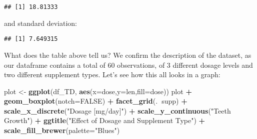 \documentclass[]{article}
\newenvironment{Shaded}{\begin{snugshade}}{\end{snugshade}}
\newcommand{\DataTypeTok}[1]{\textcolor[rgb]{0.13,0.29,0.53}{#1}}
\newcommand{\KeywordTok}[1]{\textcolor[rgb]{0.13,0.29,0.53}{\textbf{#1}}}
\newcommand{\NormalTok}[1]{#1}
\newcommand{\OperatorTok}[1]{\textcolor[rgb]{0.81,0.36,0.00}{\textbf{#1}}}
\newcommand{\OtherTok}[1]{\textcolor[rgb]{0.56,0.35,0.01}{#1}}
\newcommand{\StringTok}[1]{\textcolor[rgb]{0.31,0.60,0.02}{#1}}
\begin{document}
\begin{Shaded}
\end{Shaded}

\begin{verbatim}
## [1] 18.81333
\end{verbatim}

and standard deviation:

\begin{Shaded}
\end{Shaded}

\begin{verbatim}
## [1] 7.649315
\end{verbatim}

What does the table above tell us? We confirm the description of the
dataset, as our dataframe contains a total of 60 observations, of 3
different dosage levels and two different supplement types. Let's see
how this all looks in a graph:

\begin{Shaded}
\begin{Highlighting}[]
\NormalTok{plot <-}\StringTok{ }\KeywordTok{ggplot}\NormalTok{(df_TD, }
               \KeywordTok{aes}\NormalTok{(}\DataTypeTok{x=}\NormalTok{dose,}\DataTypeTok{y=}\NormalTok{len,}\DataTypeTok{fill=}\NormalTok{dose))}
\NormalTok{plot }\OperatorTok{+}\StringTok{ }\KeywordTok{geom_boxplot}\NormalTok{(}\DataTypeTok{notch=}\OtherTok{FALSE}\NormalTok{) }\OperatorTok{+}\StringTok{ }\KeywordTok{facet_grid}\NormalTok{(.}\OperatorTok{~}\NormalTok{supp) }\OperatorTok{+}
\StringTok{     }\KeywordTok{scale_x_discrete}\NormalTok{(}\StringTok{"Dosage [mg/day]"}\NormalTok{) }\OperatorTok{+}\StringTok{   }
\StringTok{     }\KeywordTok{scale_y_continuous}\NormalTok{(}\StringTok{"Teeth Growth"}\NormalTok{) }\OperatorTok{+}\StringTok{  }
\StringTok{     }\KeywordTok{ggtitle}\NormalTok{(}\StringTok{"Effect of Dosage and Supplement Type"}\NormalTok{) }\OperatorTok{+}
\StringTok{     }\KeywordTok{scale_fill_brewer}\NormalTok{(}\DataTypeTok{palette=}\StringTok{"Blues"}\NormalTok{)}
\end{Highlighting}
\end{Shaded}
\end{document}
